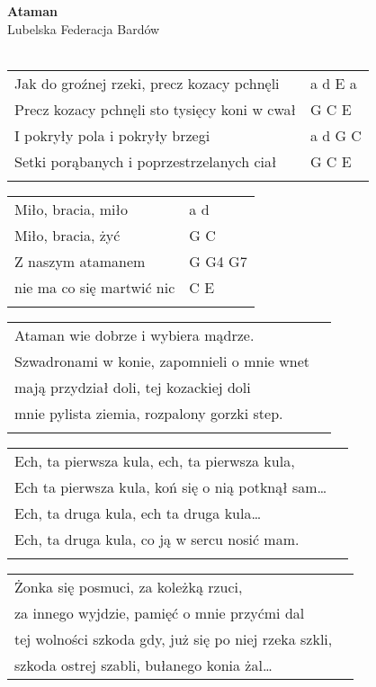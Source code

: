 \documentclass[a5paper]{article}
\begin{document}


\noindent
\fontsize{12pt}{15pt}\selectfont
\textbf{Ataman} \\
\fontsize{8pt}{10pt}\selectfont
Lubelska Federacja Bardów \\ \\
\fontsize{10pt}{12pt}\selectfont
{}
\begin{tabular}{@{}p{9cm}p{3cm}@{}}
\noindent
Jak do groźnej rzeki, precz kozacy pchnęli & a d E a \\
Precz kozacy pchnęli sto tysięcy koni w cwał & G C E \\
I pokryły pola i pokryły brzegi & a d G C \\
Setki porąbanych i poprzestrzelanych ciał & G C E \\ \\
\end{tabular}

\noindent
\begin{tabular}{@{}p{7cm}p{3cm}@{}}
Miło, bracia, miło & a d \\
Miło, bracia, żyć & G C \\
Z naszym atamanem & G G4 G7 \\
nie ma co się martwić nic & C E \\ \\
\end{tabular}

\noindent
\begin{tabular}{@{}p{8.5cm}p{3cm}@{}}
Ataman wie dobrze i wybiera mądrze.\\
Szwadronami w konie, zapomnieli o mnie wnet\\
mają przydział doli, tej kozackiej doli\\
mnie pylista ziemia, rozpalony gorzki step.\\\\
\end{tabular}

\noindent
\begin{tabular}{@{}p{8.5cm}p{3cm}@{}}
Ech, ta pierwsza kula, ech, ta pierwsza kula,\\
Ech  ta pierwsza kula, koń się o nią potknął sam… \\
Ech, ta druga kula, ech ta druga kula… \\
Ech, ta druga kula, co ją w sercu nosić mam. \\ \\
\end{tabular}

\noindent
\begin{tabular}{@{}p{8.5cm}p{3cm}@{}}
Żonka się posmuci, za koleżką rzuci,\\
za innego wyjdzie, pamięć o mnie przyćmi dal\\
tej wolności szkoda gdy, już się po niej rzeka szkli,\\
szkoda ostrej szabli, bułanego konia żal…
\end{tabular}
\end{document}
